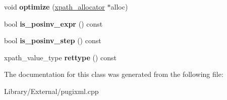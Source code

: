 \begin{DoxyCompactItemize}
\item 
\hypertarget{classxpath__ast__node_a950534fc7de08fe40d897ebea84c1d6d}{}void {\bfseries optimize} (\hyperlink{classxpath__allocator}{xpath\+\_\+allocator} $\ast$alloc)\label{classxpath__ast__node_a950534fc7de08fe40d897ebea84c1d6d}

\item 
\hypertarget{classxpath__ast__node_aa683d40f3ad22dfe89889bf6ca888082}{}bool {\bfseries is\+\_\+posinv\+\_\+expr} () const \label{classxpath__ast__node_aa683d40f3ad22dfe89889bf6ca888082}

\item 
\hypertarget{classxpath__ast__node_a2af0b84caf47031c30c80f5c2206392e}{}bool {\bfseries is\+\_\+posinv\+\_\+step} () const \label{classxpath__ast__node_a2af0b84caf47031c30c80f5c2206392e}

\item 
\hypertarget{classxpath__ast__node_a2c3598521141ed4b763fe6c4f852234f}{}xpath\+\_\+value\+\_\+type {\bfseries rettype} () const \label{classxpath__ast__node_a2c3598521141ed4b763fe6c4f852234f}

\end{DoxyCompactItemize}


The documentation for this class was generated from the following file\+:\begin{DoxyCompactItemize}
\item 
Library/\+External/pugixml.\+cpp\end{DoxyCompactItemize}
